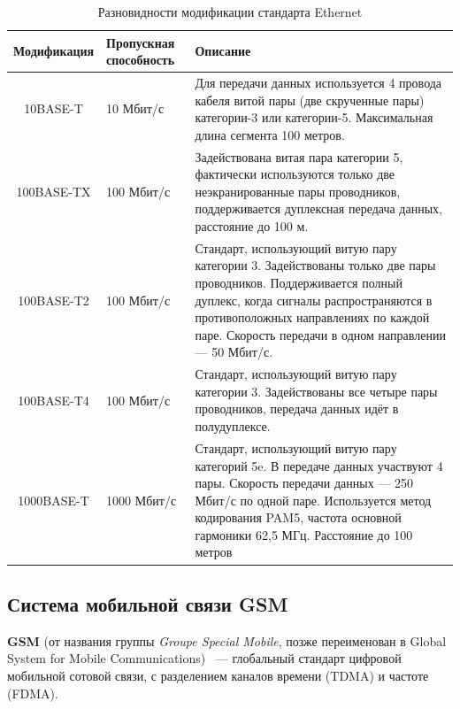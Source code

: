 \begin{table}[h!]
\caption{Разновидности модификации стандарта Ethernet \cite{ethersite2}}
\label{ethernettable}
\begin{tabular}{|c|m{30mm}|p{90mm}|}
\hline
Модификация & Пропускная способность & Описание\\
\hline
10BASE-T & 10 Мбит/с & Для передачи данных используется 4 провода кабеля витой пары (две скрученные пары) категории-3 или категории-5. Максимальная длина сегмента 100 метров.\\
\hline
100BASE-TX & 100 Мбит/с & Задействована витая пара категории 5, фактически используются только две неэкранированные пары проводников, поддерживается дуплексная передача данных, расстояние до 100 м.\\
\hline
100BASE-T2 & 100 Мбит/с & Стандарт, использующий витую пару категории 3. Задействованы только две пары проводников. Поддерживается полный дуплекс, когда сигналы распространяются в противоположных направлениях по каждой паре. Скорость передачи в одном направлении — 50 Мбит/с.\\
\hline
100BASE-T4 & 100 Мбит/с & Стандарт, использующий витую пару категории 3. Задействованы все четыре пары проводников, передача данных идёт в полудуплексе.\\
\hline
1000BASE-T & 1000 Мбит/с & Стандарт, использующий витую пару категорий 5e. В передаче данных участвуют 4 пары. Скорость передачи данных — 250 Мбит/с по одной паре. Используется метод кодирования PAM5, частота основной гармоники 62,5 МГц. Расстояние до 100 метров\\
\hline
\end{tabular}
\end{table}


\newpage

\iffalse %
\subsection{Система мобильной связи GSM}

\textbf{GSM} (от названия группы \textit{Groupe Special Mobile}, позже переименован в Global System for Mobile Communications) ~--- глобальный стандарт цифровой мобильной сотовой связи, с разделением каналов времени (TDMA) и частоте (FDMA)\cite{gsmwiki}.

